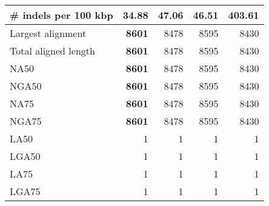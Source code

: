 \documentclass[12pt,a4paper]{article}
\begin{document}
\begin{table}[ht]
\begin{center}
\begin{tabular}{|l*{4}{|r}|}
\# indels per 100 kbp & {\bf 34.88} & 47.06 & 46.51 & 403.61 \\ \hline
Largest alignment & {\bf 8601} & 8478 & 8595 & 8430 \\ \hline
Total aligned length & {\bf 8601} & 8478 & 8595 & 8430 \\ \hline
NA50 & {\bf 8601} & 8478 & 8595 & 8430 \\ \hline
NGA50 & {\bf 8601} & 8478 & 8595 & 8430 \\ \hline
NA75 & {\bf 8601} & 8478 & 8595 & 8430 \\ \hline
NGA75 & {\bf 8601} & 8478 & 8595 & 8430 \\ \hline
LA50 & 1 & 1 & 1 & 1 \\ \hline
LGA50 & 1 & 1 & 1 & 1 \\ \hline
LA75 & 1 & 1 & 1 & 1 \\ \hline
LGA75 & 1 & 1 & 1 & 1 \\ \hline
\end{tabular}
\end{center}
\end{table}
\end{document}
